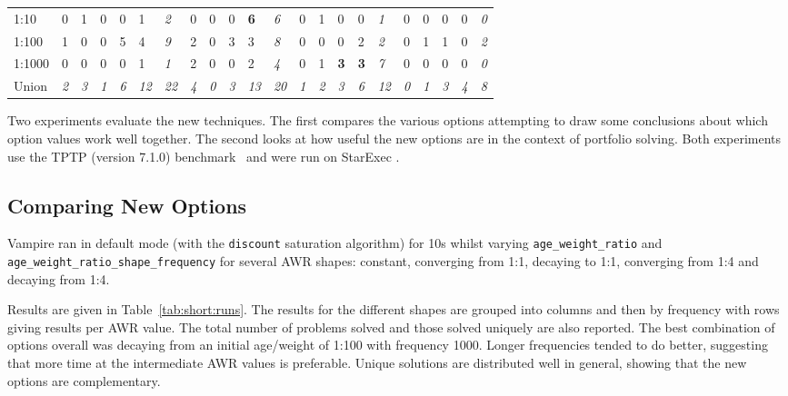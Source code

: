 \documentclass{llncs}
\begin{document}
{\begin{landscape}
\begin{table}[p]
\begin{tabular}{l|l|lllll|lllll|lllll|lllll}
1:10 & 0 & 1 & 0 & 0 & 1 & \emph{2} & 0 & 0 & 0 & \textbf{6} & \emph{6} & 0 & 1 & 0 & 0 & \emph{1} & 0 & 0 & 0 & 0 & \emph{0}\\
1:100 & 1 & 0 & 0 & 5 & 4 & \emph{9} & 2 & 0 & 3 & 3 & \emph{8} & 0 & 0 & 0 & 2 & \emph{2} & 0 & 1 & 1 & 0 & \emph{2}\\
1:1000 & 0 & 0 & 0 & 0 & 1 & \emph{1} & 2 & 0 & 0 & 2 & \emph{4} & 0 & 1 & \textbf{3} & \textbf{3} & \emph{7} & 0 & 0 & 0 & 0 & \emph{0}\\
\hline
Union & \emph{2} & \emph{3} & \emph{1} & \emph{6} & \emph{12} & \emph{22} & \emph{4} & \emph{0} & \emph{3} & \emph{13} & \emph{20} & \emph{1} & \emph{2} & \emph{3} & \emph{6} & \emph{12} & \emph{0} & \emph{1} & \emph{3} & \emph{4} & \emph{8}\\
\end{tabular}
\end{table}
\end{landscape}
}

Two experiments evaluate the new techniques.
The first compares the various options attempting to draw some conclusions about which option values work well together. The second looks at how useful the new options are in the context of portfolio solving. Both experiments use the TPTP (version 7.1.0) benchmark~\cite{tptp} and were run on StarExec \cite{starexec}.

\subsection{Comparing New Options}

Vampire ran in default mode (with the \texttt{discount} saturation algorithm) for 10s whilst varying  \texttt{age\_weight\_ratio} and \texttt{age\_weight\_ratio\_shape\_frequency} for several AWR shapes: constant, converging from 1:1, decaying to 1:1, converging from 1:4 and decaying from 1:4.

Results are given in Table~\ref{tab:short:runs}.
The results for the different shapes are grouped into columns and then by frequency with rows giving results per AWR value.
The total number of problems solved and those solved uniquely are also reported.
The best combination of options overall was decaying from an initial age/weight of 1:100 with frequency 1000.
Longer frequencies tended to do better, suggesting that more time at the intermediate AWR values is preferable. 
Unique solutions are distributed well in general, showing that the new options are complementary.
\end{document}
